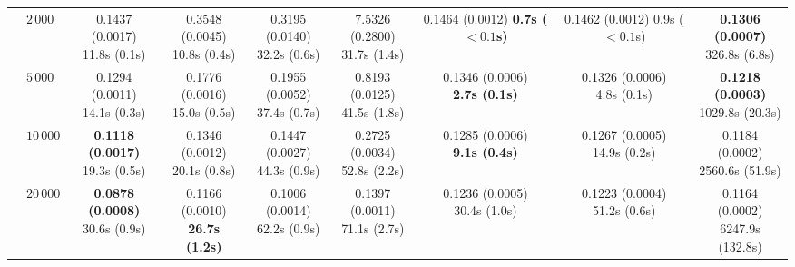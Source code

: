 \begin{table}[htbp]
{\begin{tabular}{llccccccc}
 & $2{\,}000$ & \makecell{0.1437 (0.0017) \\ \scriptsize 11.8s (0.1s)} & \makecell{0.3548 (0.0045) \\ \scriptsize 10.8s (0.4s)} & \makecell{0.3195 (0.0140) \\ \scriptsize 32.2s (0.6s)} & \makecell{7.5326 (0.2800) \\ \scriptsize 31.7s (1.4s)} & \makecell{0.1464 (0.0012) \\ \scriptsize \textbf{0.7s ($\boldsymbol{{<}0.1}$s)}} & \makecell{0.1462 (0.0012) \\ \scriptsize 0.9s (${<}0.1$s)} & \makecell{\textbf{0.1306 (0.0007)} \\ \scriptsize 326.8s (6.8s)} \\
 & $5{\,}000$ & \makecell{0.1294 (0.0011) \\ \scriptsize 14.1s (0.3s)} & \makecell{0.1776 (0.0016) \\ \scriptsize 15.0s (0.5s)} & \makecell{0.1955 (0.0052) \\ \scriptsize 37.4s (0.7s)} & \makecell{0.8193 (0.0125) \\ \scriptsize 41.5s (1.8s)} & \makecell{0.1346 (0.0006) \\ \scriptsize \textbf{2.7s (0.1s)}} & \makecell{0.1326 (0.0006) \\ \scriptsize 4.8s (0.1s)} & \makecell{\textbf{0.1218 (0.0003)} \\ \scriptsize 1029.8s (20.3s)} \\
 & $10{\,}000$ & \makecell{\textbf{0.1118 (0.0017)} \\ \scriptsize 19.3s (0.5s)} & \makecell{0.1346 (0.0012) \\ \scriptsize 20.1s (0.8s)} & \makecell{0.1447 (0.0027) \\ \scriptsize 44.3s (0.9s)} & \makecell{0.2725 (0.0034) \\ \scriptsize 52.8s (2.2s)} & \makecell{0.1285 (0.0006) \\ \scriptsize \textbf{9.1s (0.4s)}} & \makecell{0.1267 (0.0005) \\ \scriptsize 14.9s (0.2s)} & \makecell{0.1184 (0.0002) \\ \scriptsize 2560.6s (51.9s)} \\
 & $20{\,}000$ & \makecell{\textbf{0.0878 (0.0008)} \\ \scriptsize 30.6s (0.9s)} & \makecell{0.1166 (0.0010) \\ \scriptsize \textbf{26.7s (1.2s)}} & \makecell{0.1006 (0.0014) \\ \scriptsize 62.2s (0.9s)} & \makecell{0.1397 (0.0011) \\ \scriptsize 71.1s (2.7s)} & \makecell{0.1236 (0.0005) \\ \scriptsize 30.4s (1.0s)} & \makecell{0.1223 (0.0004) \\ \scriptsize 51.2s (0.6s)} & \makecell{0.1164 (0.0002) \\ \scriptsize 6247.9s (132.8s)} \\
\hline
\end{tabular}%
}
\end{table}
